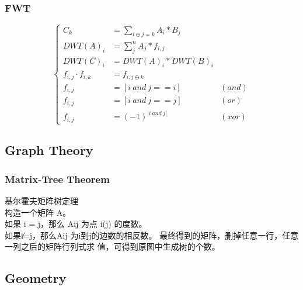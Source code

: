 \documentclass[10pt]{ctexart}
\begin{document}
{{\subsubsection{FWT}
\begin{equation*}
\left\{
    \begin{aligned}
        C_k&=\sum_{i\oplus j=k}A_i*B_j \\
        DWT(A)_i&=\sum_j^nA_j*f_{i,j} \\
        DWT(C)_i&=DWT(A)_i*DWT(B)_i\\
        f_{i,j} \cdot f_{i,k} &=f_{i,j\oplus k}\\
        f_{i,j} &= [i \ and \ j == i] \  &(and)\\
        f_{i,j} &= [i \  and \  j == j] \ &(or)\\
        f_{i,j} &= (-1)^{| i \  and \  j |} \ &(xor)
    \end{aligned}
\right.
\end{equation*}
\subsection{Graph Theory}
\subsubsection{Matrix-Tree Theorem}
基尔霍夫矩阵树定理\\
构造一个矩阵 A。\\
如果 i = j，那么 Aij 为点 i(j) 的度数。\\
如果i̸=j，那么Aij 为i到j的边数的相反数。 最终得到的矩阵，删掉任意一行，任意一列之后的矩阵行列式求 值，可得到原图中生成树的个数。\\
\subsection{Geometry}
}}
\end{document}
